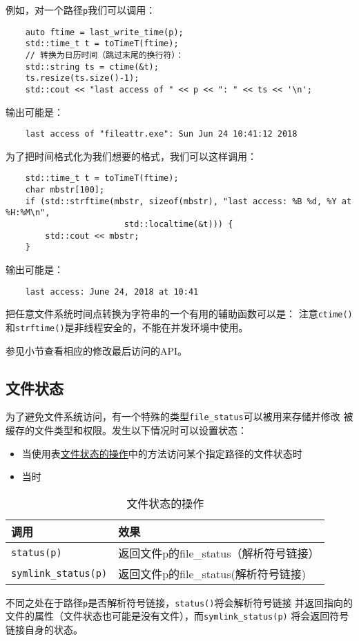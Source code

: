 例如，对一个路径\texttt{p}我们可以调用：
\begin{lstlisting}
    auto ftime = last_write_time(p);
    std::time_t t = toTimeT(ftime);
    // 转换为日历时间（跳过末尾的换行符）：
    std::string ts = ctime(&t);
    ts.resize(ts.size()-1);
    std::cout << "last access of " << p << ": " << ts << '\n';
\end{lstlisting}
输出可能是：
\begin{lstlisting}
    last access of "fileattr.exe": Sun Jun 24 10:41:12 2018
\end{lstlisting}
为了把时间格式化为我们想要的格式，我们可以这样调用：
\begin{lstlisting}
    std::time_t t = toTimeT(ftime);
    char mbstr[100];
    if (std::strftime(mbstr, sizeof(mbstr), "last access: %B %d, %Y at %H:%M\n",
                        std::localtime(&t))) {
        std::cout << mbstr;
    }
\end{lstlisting}
输出可能是：
\begin{lstlisting}
    last access: June 24, 2018 at 10:41
\end{lstlisting}
把任意文件系统时间点转换为字符串的一个有用的辅助函数可以是：
注意\texttt{ctime()}和\texttt{strftime()}是非线程安全的，不能在并发环境中使用。

参见小节查看相应的修改最后访问的API。

\subsection{文件状态}\label{ch20.4.2}
为了避免文件系统访问，有一个特殊的类型\texttt{file\_status}可以被用来存储并修改
被缓存的文件类型和权限。发生以下情况时可以设置状态：
\begin{itemize}
    \item 当使用表\hyperref[t20.12]{文件状态的操作}中的方法访问某个指定路径的文件状态时
    \item 当时
\end{itemize}
\begin{table}[htb]
    \centering
    \begin{tabular}{l|l}
        \hline
        \textbf{调用}                 & \textbf{效果}                \\
        \hline
        \texttt{status(p)}          & 返回文件p的file\_status（解析符号链接） \\
        \texttt{symlink\_status(p)} & 返回文件p的file\_status(解析符号链接) \\
        \hline
    \end{tabular}
    \caption{文件状态的操作}
    \label{t20.12}
\end{table}
不同之处在于路径\texttt{p}是否解析符号链接，\texttt{status()}将会解析符号链接
并返回指向的文件的属性（文件状态也可能是没有文件），而\texttt{symlink\_status(p)}
将会返回符号链接自身的状态。

